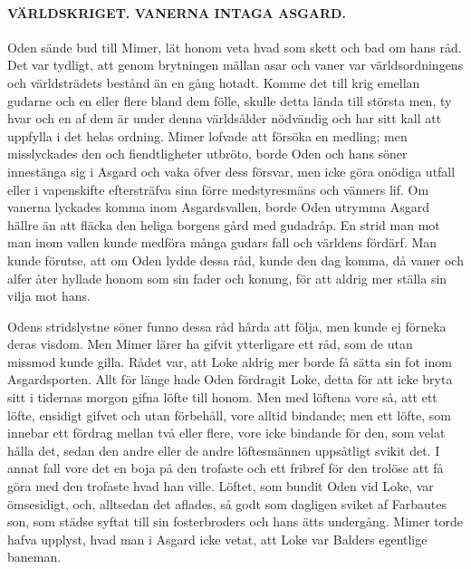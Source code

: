 \paragraph{VÄRLDSKRIGET. VANERNA INTAGA ASGARD.}

Oden sände bud till Mimer, lät honom veta hvad som skett och bad om hans
råd. Det var tydligt, att genom brytningen mällan asar och vaner var
världsordningens och världsträdets bestånd än en gång hotadt. Komme det
till krig emellan gudarne och en eller flere bland dem fölle, skulle
detta lända till största men, ty hvar och en af dem är under denna
världsålder nödvändig och har sitt kall att
\protect\hypertarget{lb1625905.xhtmlux5cux23start144}{}{}\protect\hypertarget{lb1625905.xhtmlux5cux23start144-a}{}{}\protect\hypertarget{lb1625905.xhtmlux5cux23start144-b}{}{}\protect\hypertarget{lb1625905.xhtmlux5cux23start144-c}{}{}\protect\hypertarget{lb1625905.xhtmlux5cux23start144-d}{}{}
uppfylla i det helas ordning. Mimer lofvade att försöka en medling; men
misslyckades den och fiendtligheter utbröto, borde Oden och hans söner
innestänga sig i Asgard och vaka öfver dess försvar, men icke göra
onödiga utfall eller i vapenskifte eftersträfva sina förre medstyresmäns
och vänners lif. Om vanerna lyckades komma inom Asgardsvallen, borde
Oden utrymma Asgard hällre än att fläcka den heliga borgens gård med
gudadråp. En strid man mot man inom vallen kunde medföra många gudars
fall och världens fördärf. Man kunde förutse, att om Oden lydde dessa
råd, kunde den dag komma, då vaner och alfer åter hyllade honom som sin
fader och konung, för att aldrig mer ställa sin vilja mot hans.

Odens stridslystne söner funno dessa råd hårda att följa, men kunde ej
förneka deras visdom. Men Mimer lärer ha gifvit ytterligare ett råd, som
de utan missmod kunde gilla. Rådet var, att Loke aldrig mer borde få
sätta sin fot inom Asgardsporten. Allt för länge hade Oden fördragit
Loke, detta för att icke bryta sitt i tidernas morgon gifna löfte till
honom. Men med löftena vore så, att ett löfte, ensidigt gifvet och utan
förbehåll, vore alltid bindande; men ett löfte, som innebar ett fördrag
mellan två eller flere, vore icke bindande för den, som velat hålla det,
sedan den andre eller de andre löftesmännen uppsåtligt svikit det. I
annat fall vore det en boja på den trofaste och ett fribref för den
trolöse att få göra med den trofaste hvad han ville. Löftet, som bundit
Oden vid Loke, var ömsesidigt, och, alltsedan det aflades, så godt som
dagligen sviket af Farbautes son, som städse syftat till sin
fosterbroders och hans ätts undergång. Mimer torde hafva upplyst, hvad
man i Asgard icke vetat, att Loke var Balders egentlige baneman.

